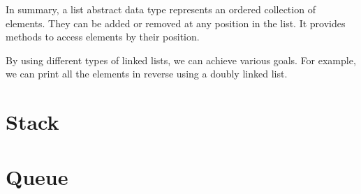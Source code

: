 In summary, a list abstract data type represents an ordered collection of elements. They can be added or removed at any position in the list. It provides methods to access elements by their position.

By using different types of linked lists, we can achieve various goals. For example, we can print all the elements in reverse using a doubly linked list.

\section{Stack}





\section{Queue}